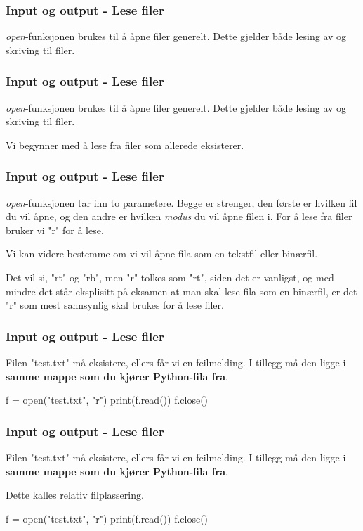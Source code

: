 
\begin{frame}
    \frametitle{Input og output - Lese filer}

    \textit{open}-funksjonen brukes til å åpne filer generelt. Dette gjelder både lesing av og skriving til filer. 

\end{frame}


\begin{frame}
    \frametitle{Input og output - Lese filer}

    \textit{open}-funksjonen brukes til å åpne filer generelt. Dette gjelder både lesing av og skriving til filer. 

    Vi begynner med å lese fra filer som allerede eksisterer. 

\end{frame}


\begin{frame}
    \frametitle{Input og output - Lese filer}

    \textit{open}-funksjonen tar inn to parametere. Begge er strenger, den første er hvilken fil du vil åpne, og den andre er hvilken \textit{modus} du vil åpne filen i. For å lese fra filer bruker vi "r" for å lese. 
    
    Vi kan videre bestemme om vi vil åpne fila som en tekstfil eller binærfil. 

    Det vil si, "rt" og "rb", men "r" tolkes som "rt", siden det er vanligst, og med mindre det står eksplisitt på eksamen at man skal lese fila som en binærfil, er det "r" som mest sannsynlig skal brukes for å lese filer. 

\end{frame}

\begin{frame}[fragile]
    \frametitle{Input og output - Lese filer}

    Filen "test.txt" må eksistere, ellers får vi en feilmelding. I tillegg må den ligge i \textbf{samme mappe som du kjører Python-fila fra}. 

\begin{python}
f = open("test.txt", "r")
print(f.read())
f.close()
\end{python}

\end{frame}

\begin{frame}[fragile]
    \frametitle{Input og output - Lese filer}

    Filen "test.txt" må eksistere, ellers får vi en feilmelding. I tillegg må den ligge i \textbf{samme mappe som du kjører Python-fila fra}. 

    Dette kalles relativ filplassering. 

\begin{python}
f = open("test.txt", "r")
print(f.read())
f.close()
\end{python}

\end{frame}

